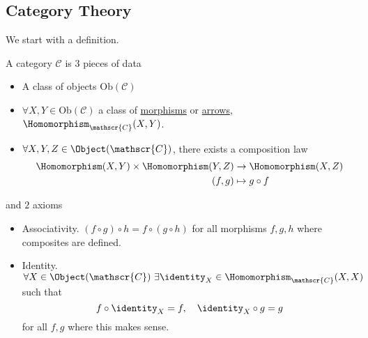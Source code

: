 \subsection{Category Theory}
We start with a definition.
\begin{definition}\label{def:object,morphism}
	A category \(\mathscr{C} \) is \(3\) pieces of data
	\begin{itemize}
		\item A class of objects \(\mathrm{Ob}(\mathscr{C})\)
		\item \(\forall X, Y\in\mathrm{Ob} (\mathscr{C})\) a class of \underline{morphisms} or \underline{arrows},
		      \(\Homomorphism_{\mathscr{C}}(X, Y)\).
		\item \(\forall X, Y, Z\in \Object (\mathscr{C})\), there exists a composition law
		      \[
			      \begin{split}
				      \Homomorphism (X, Y)\times \Homomorphism (Y, Z)&\to \Homomorphism (X, Z)\\
				      (f, g)&\mapsto g\circ f
			      \end{split}
		      \]
	\end{itemize}
	and \(2\) axioms
	\begin{itemize}
		\item Associativity. \((f\circ g)\circ h = f\circ (g\circ h)\) for all morphisms \(f, g, h\) where composites are defined.
		\item Identity. \(\forall X\in\Object (\mathscr{C})\ \exists \identity_{X}\in\Homomorphism _{\mathscr{C}} (X, X)\) such that
		      \[
			      f\circ \identity_{X} = f,\quad \identity_{X} \circ g = g
		      \]
		      for all \(f, g\) where this makes sense.
	\end{itemize}
\end{definition}

